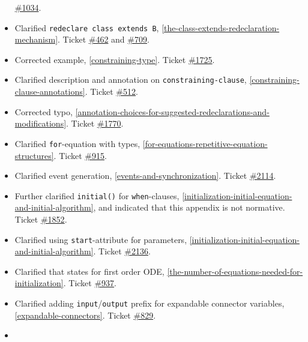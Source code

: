 \begin{itemize}
  \href{https://github.com/modelica/ModelicaSpecification/issues/1034}{\#1034}.
\item
  Clarified \lstinline!redeclare class extends B!, \cref{the-class-extends-redeclaration-mechanism}. Ticket
  \href{https://github.com/modelica/ModelicaSpecification/issues/462}{\#462} and
  \href{https://github.com/modelica/ModelicaSpecification/issues/709}{\#709}.
\item
  Corrected example, \cref{constraining-type}. Ticket
  \href{https://github.com/modelica/ModelicaSpecification/issues/1725}{\#1725}.
\item
  Clarified description and annotation on \lstinline[language=grammar]!constraining-clause!, \cref{constraining-clause-annotations}. Ticket
  \href{https://github.com/modelica/ModelicaSpecification/issues/512}{\#512}.
\item
  Corrected typo, \cref{annotation-choices-for-suggested-redeclarations-and-modifications}. Ticket
  \href{https://github.com/modelica/ModelicaSpecification/issues/1770}{\#1770}.
\item
  Clarified \lstinline!for!-equation with types, \cref{for-equations-repetitive-equation-structures}.
  Ticket \href{https://github.com/modelica/ModelicaSpecification/issues/915}{\#915}.
\item
  Clarified event generation, \cref{events-and-synchronization}. Ticket
  \href{https://github.com/modelica/ModelicaSpecification/issues/2114}{\#2114}.
\item
  Further clarified \lstinline!initial()! for \lstinline!when!-clauses, \cref{initialization-initial-equation-and-initial-algorithm}, and indicated that this appendix is not normative.
  Ticket \href{https://github.com/modelica/ModelicaSpecification/issues/1852}{\#1852}.
\item
  Clarified using \lstinline!start!-attribute for parameters, \cref{initialization-initial-equation-and-initial-algorithm}. Ticket
  \href{https://github.com/modelica/ModelicaSpecification/issues/2136}{\#2136}.
\item
  Clarified that states for first order ODE, \cref{the-number-of-equations-needed-for-initialization}. Ticket
  \href{https://github.com/modelica/ModelicaSpecification/issues/937}{\#937}.
\item
  Clarified adding \lstinline!input!/\lstinline!output! prefix for expandable connector variables, \cref{expandable-connectors}.
  Ticket \href{https://github.com/modelica/ModelicaSpecification/issues/829}{\#829}.
\item

\end{itemize}
